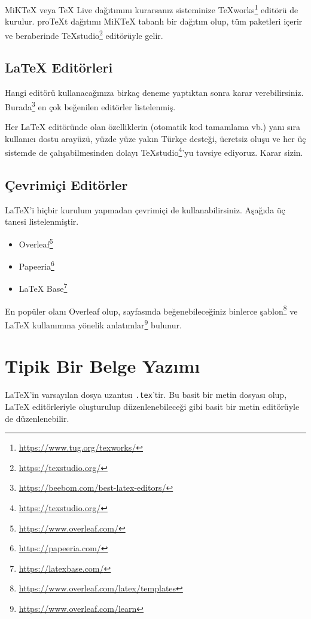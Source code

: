 \documentclass[
  10pt,
]{scrbook}
\providecommand{\tightlist}{%
  \setlength{\itemsep}{0pt}\setlength{\parskip}{0pt}}
\renewcommand{\href}[2]{#2\footnote{\url{#1}}}
\theoremstyle{definition}
\theoremstyle{definition}
\theoremstyle{definition}
\theoremstyle{definition}
\theoremstyle{remark}
\begin{document}
MiKTeX veya TeX Live dağıtımını kurarsanız sisteminize \href{https://www.tug.org/texworks/}{TeXworks} editörü de kurulur. proTeXt dağıtımı MiKTeX tabanlı bir dağıtım olup, tüm paketleri içerir ve beraberinde \href{https://texstudio.org/}{TeXstudio} editörüyle gelir.

\hypertarget{latex-edituxf6rleri}{%
\subsection{LaTeX Editörleri}\label{latex-edituxf6rleri}}

Hangi editörü kullanacağınıza birkaç deneme yaptıktan sonra karar verebilirsiniz. \href{https://beebom.com/best-latex-editors/}{Burada} en çok beğenilen editörler listelenmiş.

Her LaTeX editöründe olan özelliklerin (otomatik kod tamamlama vb.) yanı sıra kullanıcı dostu arayüzü, yüzde yüze yakın Türkçe desteği, ücretsiz oluşu ve her üç sistemde de çalışabilmesinden dolayı \href{https://texstudio.org/}{TeXstudio}'yu tavsiye ediyoruz. Karar sizin.

\hypertarget{uxe7evrimiuxe7i-edituxf6rler}{%
\subsection{Çevrimiçi Editörler}\label{uxe7evrimiuxe7i-edituxf6rler}}

LaTeX'i hiçbir kurulum yapmadan çevrimiçi de kullanabilirsiniz. Aşağıda üç tanesi listelenmiştir.

\begin{itemize}
\tightlist
\item
  \href{https://www.overleaf.com/}{Overleaf}
\item
  \href{https://papeeria.com/}{Papeeria}
\item
  \href{https://latexbase.com/}{LaTeX Base}
\end{itemize}

En popüler olanı Overleaf olup, sayfasında beğenebileceğiniz binlerce \href{https://www.overleaf.com/latex/templates}{şablon} ve LaTeX kullanımına yönelik \href{https://www.overleaf.com/learn}{anlatımlar} bulunur.

\hypertarget{tipik}{%
\section{Tipik Bir Belge Yazımı}\label{tipik}}

LaTeX'in varsayılan dosya uzantısı \texttt{.tex}'tir. Bu basit bir metin dosyası olup, LaTeX editörleriyle oluşturulup düzenlenebileceği gibi basit bir metin editörüyle de düzenlenebilir.
\end{document}
